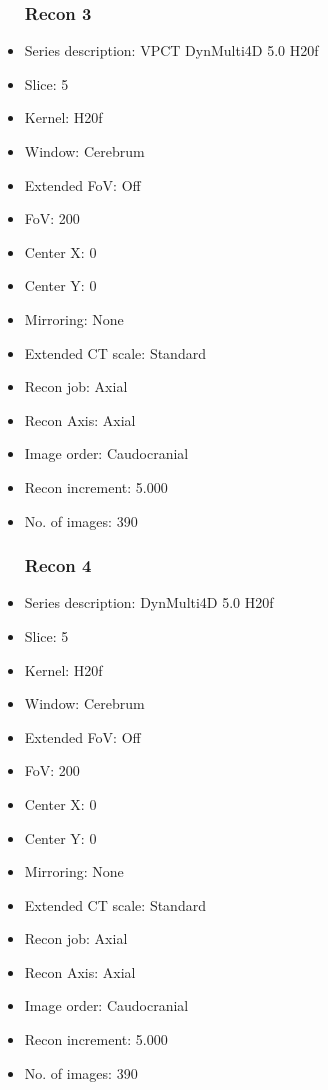 \documentclass[12pt]{article}
\begin{document}
\begin{itemize}
\subsubsection{Recon 3}
\item Series description: VPCT DynMulti4D 5.0 H20f
\item Slice: 5
\item Kernel: H20f
\item Window: Cerebrum
\item Extended FoV: Off
\item FoV: 200
\item Center X: 0
\item Center Y: 0
\item Mirroring: None
\item Extended CT scale: Standard
\item Recon job: Axial
\item Recon Axis: Axial
\item Image order: Caudocranial
\item Recon increment: 5.000
\item No. of images: 390
\subsubsection{Recon 4}
\item Series description: DynMulti4D 5.0 H20f
\item Slice: 5
\item Kernel: H20f
\item Window: Cerebrum
\item Extended FoV: Off
\item FoV: 200
\item Center X: 0
\item Center Y: 0
\item Mirroring: None
\item Extended CT scale: Standard
\item Recon job: Axial
\item Recon Axis: Axial
\item Image order: Caudocranial
\item Recon increment: 5.000
\item No. of images: 390
\end{itemize}
\end{document}
